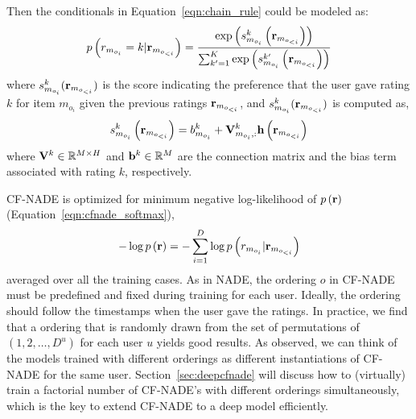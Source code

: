 \documentclass{article}
\newcommand{\cfnade}{CF-NADE\xspace}
\newcommand{\reals}{\mathbb{R}}
\begin{document}
Then the conditionals in Equation~\ref{eqn:chain_rule} could be modeled as:
\begin{equation}
p\left ( r_{m_{o_i}}=k|{\bf r}_{m_{o_{<i}}} \right ) = \frac{\exp \left(s_{m_{o_i}}^{k}\left({\bf r}_{m_{o_{<i}}}\right)\right)}{\sum_{k'=1}^K\exp \left(s_{m_{o_i}}^{k'}\left({\bf r}_{m_{o_{<i}}}\right)\right)}
\label{eqn:cfnade_softmax} 
\end{equation}
where $s_{m_{o_i}}^{k}({\bf r}_{m_{o_{<i}}})$ is the score indicating the preference that the user gave rating $k$ for item $m_{o_i}$ given the previous ratings ${\bf r}_{m_{o_{<i}}}$, and $s_{m_{o_i}}^{k}({\bf r}_{m_{o_{<i}}})$ is computed as,
\begin{equation}
s_{m_{o_i}}^{k}\left({\bf r}_{m_{o_{<i}}}\right) =b^{k}_{m_{o_i}} +\mathbf{V}^{k}_{m_{o_i},:}\mathbf{h}\left ( {\bf r}_{m_{o_{<i}}} \right )
\label{eqn:score}
\end{equation}
where ${\bf V}^{k}\in \reals^{M \times H}$ and  ${\bf b}^{k} \in \reals^{M}$ are the connection matrix and the bias term associated with rating $k$, respectively. 

\cfnade is optimized for minimum negative log-likelihood of
$p\left({\bf r}\right)$ (Equation~\eqref{eqn:cfnade_softmax}),
\begin{equation}
    -\log p\left({\bf r}\right) = -\sum_{i=1}^{D}\log p\left(r_{m_{o_i}}|{\bf r}_{m_{o_{<i}}}\right) 
    \label{eqn:nll_cost}
\end{equation}
averaged over all the training cases. As in NADE, the ordering $o$ in
\cfnade must be predefined and fixed during training for each
user. Ideally, the ordering should follow the timestamps when the user
gave the ratings. In practice, we find that a ordering that is
randomly drawn from the set of permutations of $(1,2,\ldots,D^u)$ for
each user $u$ yields good results. As \citet{Uria2013b} observed, we can think of the models trained with different orderings as different instantiations of \cfnade for the same user.
Section~\ref{sec:deepcfnade} will discuss how to (virtually) train a factorial number of \cfnade 's with different orderings simultaneously, which is the key to extend \cfnade to a deep model efficiently.
\end{document}
